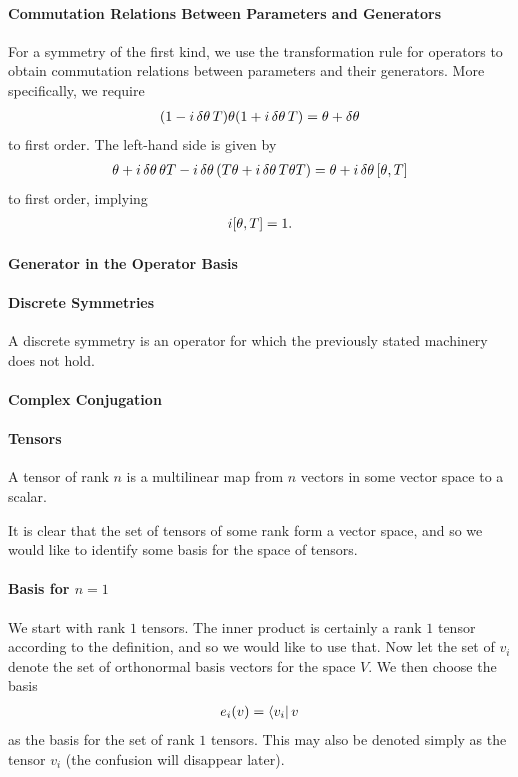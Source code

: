 \paragraph{Commutation Relations Between Parameters and Generators}
For a symmetry of the first kind, we use the transformation rule for operators to obtain commutation relations between parameters and their generators. More specifically, we require
\begin{align*}
	(1 - i\var{\theta}T)\theta(1 + i\var{\theta}T) = \theta + \var{\theta}
\end{align*}
to first order. The left-hand side is given by
\begin{align*}
	\theta + i\var{\theta}\theta T - i\var{\theta}(T\theta + i\var{\theta}T\theta T) = \theta + i\var{\theta}\comm{\theta}{T}
\end{align*}
to first order, implying
\begin{align*}
	i\comm{\theta}{T} = 1.
\end{align*}

\paragraph{Generator in the Operator Basis}

\paragraph{Discrete Symmetries}
A discrete symmetry is an operator for which the previously stated machinery does not hold.

\paragraph{Complex Conjugation}

\paragraph{Tensors}
A tensor of rank $n$ is a multilinear map from $n$ vectors in some vector space to a scalar.

It is clear that the set of tensors of some rank form a vector space, and so we would like to identify some basis for the space of tensors.

\paragraph{Basis for $n = 1$}
We start with rank $1$ tensors. The inner product is certainly a rank $1$ tensor according to the definition, and so we would like to use that. Now let the set of $v_{i}$ denote the set of orthonormal basis vectors for the space $V$. We then choose the basis
\begin{align*}
	e_{i}(v) = \bra{v_{i}}{v}
\end{align*}
as the basis for the set of rank $1$ tensors. This may also be denoted simply as the tensor $v_{i}$ (the confusion will disappear later).

